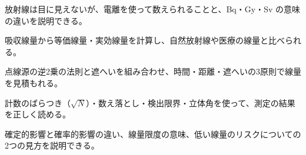 \begin{furikaeri}
\begin{checklist}
\item 放射線は目に見えないが、電離を使って数えられることと、Bq・Gy・Sv の意味の違いを説明できる。
\item 吸収線量から等価線量・実効線量を計算し、自然放射線や医療の線量と比べられる。
\item 点線源の逆2乗の法則と遮へいを組み合わせ、時間・距離・遮へいの3原則で線量を見積もれる。
\item 計数のばらつき（$\sqrt N$）・数え落とし・検出限界・立体角を使って、測定の結果を正しく読める。
\item 確定的影響と確率的影響の違い、線量限度の意味、低い線量のリスクについての2つの見方を説明できる。
\end{checklist}
\end{furikaeri}
